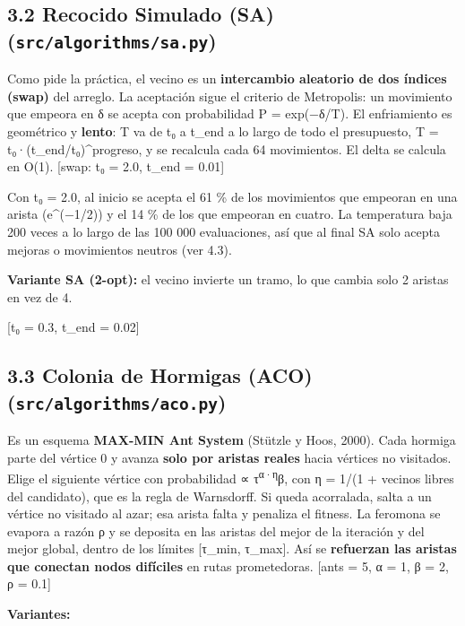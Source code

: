 \documentclass[
  spanish,
  12pt,
]{article}
\begin{document}
\subsection{\texorpdfstring{3.2 Recocido Simulado (SA)
(\texttt{src/algorithms/sa.py})}{3.2 Recocido Simulado (SA) (src/algorithms/sa.py)}}\label{recocido-simulado-sa-srcalgorithmssa.py}

Como pide la práctica, el vecino es un \textbf{intercambio aleatorio de
dos índices (swap)} del arreglo. La aceptación sigue el criterio de
Metropolis: un movimiento que empeora en δ se acepta con probabilidad P
= exp(−δ/T). El enfriamiento es geométrico y \textbf{lento}: T va de t₀
a t\_end a lo largo de todo el presupuesto, T =
t₀·(t\_end/t₀)\^{}progreso, y se recalcula cada 64 movimientos. El delta
se calcula en O(1). {[}swap: t₀ = 2.0, t\_end = 0.01{]}

Con t₀ = 2.0, al inicio se acepta el 61 \% de los movimientos que
empeoran en una arista (e\^{}(−1/2)) y el 14 \% de los que empeoran en
cuatro. La temperatura baja 200 veces a lo largo de las 100 000
evaluaciones, así que al final SA solo acepta mejoras o movimientos
neutros (ver 4.3).

\textbf{Variante SA (2-opt):} el vecino invierte un tramo, lo que cambia
solo 2 aristas en vez de 4.

{[}t₀ = 0.3, t\_end = 0.02{]}

\subsection{\texorpdfstring{3.3 Colonia de Hormigas (ACO)
(\texttt{src/algorithms/aco.py})}{3.3 Colonia de Hormigas (ACO) (src/algorithms/aco.py)}}\label{colonia-de-hormigas-aco-srcalgorithmsaco.py}

Es un esquema \textbf{MAX-MIN Ant System} (Stützle y Hoos, 2000). Cada
hormiga parte del vértice 0 y avanza \textbf{solo por aristas reales}
hacia vértices no visitados. Elige el siguiente vértice con probabilidad
∝ τ\textsuperscript{α·η}β, con η = 1/(1 + vecinos libres del candidato),
que es la regla de Warnsdorff. Si queda acorralada, salta a un vértice
no visitado al azar; esa arista falta y penaliza el fitness. La feromona
se evapora a razón ρ y se deposita en las aristas del mejor de la
iteración y del mejor global, dentro de los límites {[}τ\_min,
τ\_max{]}. Así se \textbf{refuerzan las aristas que conectan nodos
difíciles} en rutas prometedoras. {[}ants = 5, α = 1, β = 2, ρ = 0.1{]}

\textbf{Variantes:}
\end{document}
